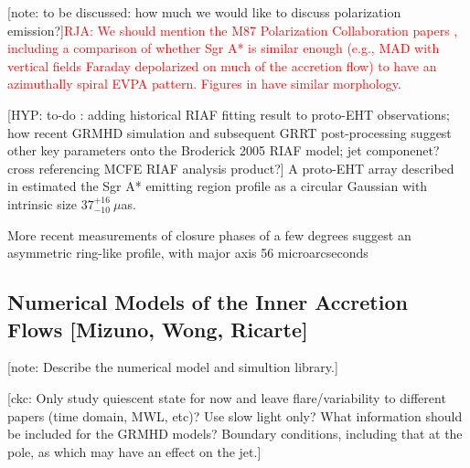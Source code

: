 \documentclass[twocolumn,tighten,dvipsnames,linenumbers]{aastex63}
\newcommand\note[1]{{\color{OliveGreen}[note: #1]}}
\newcommand\ckc[1]{{\color{MidnightBlue}[ckc: #1]}}
\newcommand\hyp[1]{{\color{Salmon}[HYP: #1]}}
\begin{document}

\note{to be discussed: how much we would like to discuss polarization emission?}\textcolor{red}{RJA: We should mention the M87 Polarization Collaboration papers \cite{EHTCPaperVII}, including a comparison of whether Sgr A* is similar enough (e.g., MAD with vertical fields Faraday depolarized on much of the accretion flow) to have an azimuthally spiral EVPA pattern. Figures in  \citep{Emami2021} have similar morphology}.

\hyp{to-do :  adding historical RIAF fitting result to proto-EHT observations; how recent  GRMHD simulation and subsequent GRRT post-processing suggest other key parameters onto the Broderick 2005 RIAF model; jet componenet? cross referencing MCFE RIAF analysis product?} A proto-EHT array described in \cite{Doeleman2008} estimated the Sgr A* emitting region profile as a circular Gaussian with intrinsic size $37^{+16}_{-10}\ \mu$as.


More recent measurements of closure phases of a few degrees \cite{Fish2016} suggest an asymmetric ring-like profile, with major axis 56 microarcseconds




\subsection{Numerical Models of the Inner Accretion Flows
  [Mizuno, Wong, Ricarte]}
\label{sec:numodels}

\note{Describe the numerical model and simultion library.}

\ckc{Only study quiescent state for now and leave flare/variability to
  different papers (time domain, MWL, etc)?
  Use slow light only?
  What information should be included for the GRMHD models?
  Boundary conditions, including that at the pole, as which may have
  an effect on the jet.}
\end{document}
